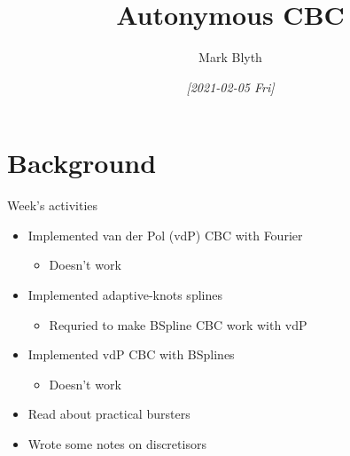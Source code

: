 \documentclass[presentation]{beamer}
\author{Mark Blyth}
\date{\textit{[2021-02-05 Fri]}}
\title{Autonymous CBC}
\begin{document}
\maketitle

\section{Background}
\label{sec:org42acd46}
\begin{frame}[label={sec:org71c6ecf}]{Week's activities}
\begin{itemize}
\item Implemented van der Pol (vdP) CBC with Fourier
\begin{itemize}
\item Doesn't work
\end{itemize}
\end{itemize}
\vfill
\begin{itemize}
\item Implemented adaptive-knots splines
\begin{itemize}
\item Requried to make BSpline CBC work with vdP
\end{itemize}
\end{itemize}
\vfill
\begin{itemize}
\item Implemented vdP CBC with BSplines
\begin{itemize}
\item Doesn't work
\end{itemize}
\end{itemize}
\vfill
\begin{itemize}
\item Read about practical bursters
\end{itemize}
\vfill
\begin{itemize}
\item Wrote some notes on discretisors
\end{itemize}
\end{frame}
\end{document}
